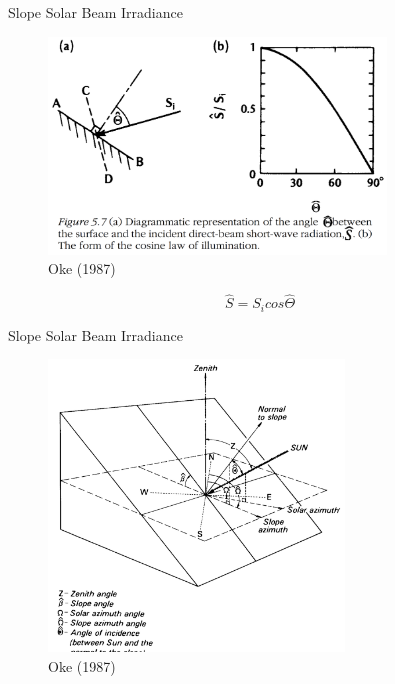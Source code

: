 
\begin{frame}{Slope Solar Beam Irradiance}
\begin{figure}
	\includegraphics[width=0.8\textwidth]{fig32.png}
	\centering \tiny~\\Oke (1987)
\end{figure}
$$\hat S = S_i cos \hat \Theta$$
\end{frame}


\begin{frame}{Slope Solar Beam Irradiance}
\begin{figure}
	\includegraphics[width=0.7\textwidth]{fig33.png}
	\centering \tiny~\\Oke (1987)
\end{figure}
\end{frame}


